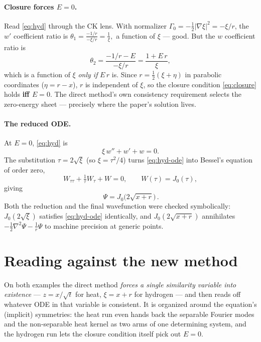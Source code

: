 \documentclass[11pt]{article}
\begin{document}
\paragraph{Closure forces $E=0$.} Read \eqref{eq:hyd} through the CK lens.
With normalizer $\Gamma_0=-\tfrac12|\nabla\xi|^2=-\xi/r$, the $w'$ coefficient
ratio is
\(
  \theta_1=\frac{-1/r}{-\xi/r}=\frac1\xi,
\)
a function of $\xi$ --- good. But the $w$ coefficient ratio is
\[
  \theta_2=\frac{-1/r-E}{-\xi/r}=\frac{1+E\,r}{\xi},
\]
which is a function of $\xi$ \emph{only if} $E\,r$ is. Since
$r=\tfrac12(\xi+\eta)$ in parabolic coordinates ($\eta=r-x$), $r$ is
independent of $\xi$, so the closure condition \eqref{eq:closure} holds
\textbf{iff $E=0$}. The direct method's own consistency requirement selects
the zero-energy sheet --- precisely where the paper's solution lives.

\paragraph{The reduced ODE.} At $E=0$, \eqref{eq:hyd} is
\begin{equation}
  \xi\,w''+w'+w=0.
  \label{eq:hyd-ode}
\end{equation}
The substitution $\tau=2\sqrt{\xi}$ (so $\xi=\tau^2/4$) turns
\eqref{eq:hyd-ode} into Bessel's equation of order zero,
\[
  W_{\tau\tau}+\tfrac1\tau W_\tau+W=0,
  \qquad W(\tau)=J_0(\tau),
\]
giving
\begin{equation}
  \boxed{\,\Psi=J_0\!\bigl(2\sqrt{x+r}\bigr)\,}.
\end{equation}
Both the reduction and the final wavefunction were checked symbolically:
$J_0(2\sqrt\xi)$ satisfies \eqref{eq:hyd-ode} identically, and
$J_0(2\sqrt{x+r})$ annihilates $-\tfrac12\nabla^2\Psi-\tfrac1r\Psi$ to
machine precision at generic points.

\section{Reading against the new method}

On both examples the direct method \emph{forces a single similarity
variable into existence} --- $z=x/\sqrt t$ for heat, $\xi=x+r$ for
hydrogen --- and then reads off whatever ODE in that variable is consistent.
It is organized around the equation's (implicit) symmetries: the heat run
even hands back the separable Fourier modes and the non-separable heat
kernel as two arms of one determining system, and the hydrogen run lets the
closure condition itself pick out $E=0$.
\end{document}
